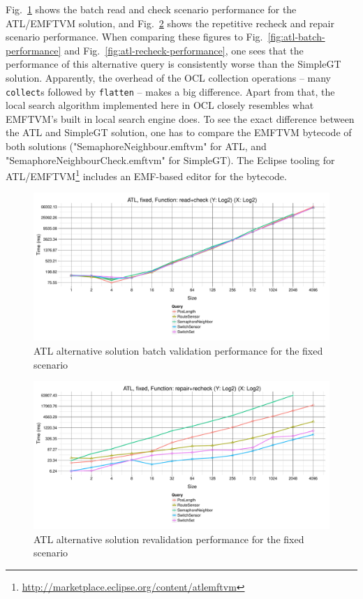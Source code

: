 \documentclass[submission,copyright,creativecommons]{eptcs}
\begin{document}
Fig.~\ref{fig:atl-batch-performance-alt} shows the batch read and check scenario performance for the ATL/EMFTVM solution, and Fig.~\ref{fig:atl-recheck-performance-alt} shows the repetitive recheck and repair scenario performance. When comparing these figures to Fig.~\ref{fig:atl-batch-performance} and Fig.~\ref{fig:atl-recheck-performance}, one sees that the performance of this alternative query is consistently worse than the SimpleGT solution. Apparently, the overhead of the OCL collection operations -- many \texttt{collect}s followed by \texttt{flatten} -- makes a big difference. Apart from that, the local search algorithm implemented here in OCL closely resembles what EMFTVM's built in local search engine does. To see the exact difference between the ATL and SimpleGT solution, one has to compare the EMFTVM bytecode of both solutions ("SemaphoreNeighbour.emftvm" for ATL, and "SemaphoreNeighbourCheck.emftvm" for SimpleGT). The Eclipse tooling for ATL/EMFTVM\footnote{\url{http://marketplace.eclipse.org/content/atlemftvm}} includes an EMF-based editor for the bytecode.

\begin{figure}[ht]
\centerline{
\includegraphics[width=15cm]{figures/fixed-ATL-GroupBy-Query-time-batch-validation-alt}}
\caption{ATL alternative solution batch validation performance for the fixed scenario}
\label{fig:atl-batch-performance-alt}
\end{figure}

\begin{figure}[ht]
\centerline{
\includegraphics[width=15cm]{figures/fixed-ATL-GroupBy-Query-time-revalidation-alt}}
\caption{ATL alternative solution revalidation performance for the fixed scenario}
\label{fig:atl-recheck-performance-alt}
\end{figure}




\end{document}
